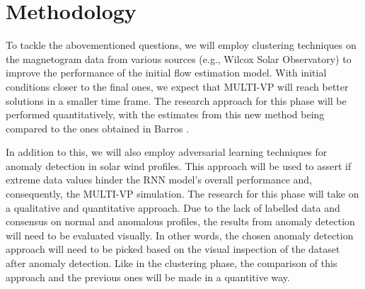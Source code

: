 \section{Methodology}
To tackle the abovementioned questions, we will employ clustering techniques on the magnetogram data from various sources (e.g., Wilcox Solar Observatory) to improve the performance of the initial flow estimation model. With initial conditions closer to the final ones, we expect that MULTI-VP will reach better solutions in a smaller time frame. The research approach for this phase will be performed quantitatively, with the estimates from this new method being compared to the ones obtained in Barros \cite{barros_InitialConditionEstimation_}.

In addition to this, we will also employ adversarial learning techniques for anomaly detection in solar wind profiles. This approach will be used to assert if extreme data values hinder the RNN model's overall performance and, consequently, the MULTI-VP simulation. The research for this phase will take on a qualitative and quantitative approach. Due to the lack of labelled data and consensus on normal and anomalous profiles, the results from anomaly detection will need to be evaluated visually. In other words, the chosen anomaly detection approach will need to be picked based on the visual inspection of the dataset after anomaly detection. Like in the clustering phase, the comparison of this approach and the previous ones will be made in a quantitive way.

















